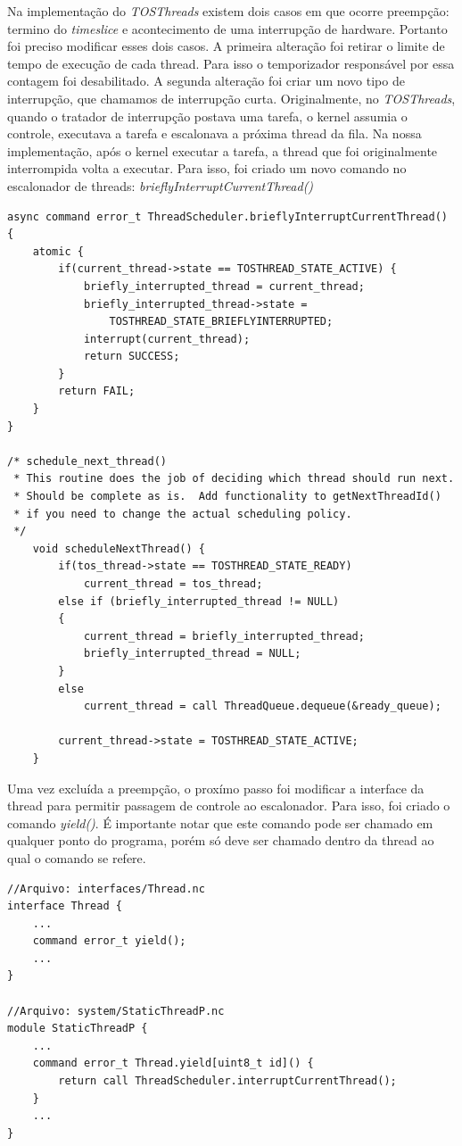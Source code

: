 \documentclass[a4paper, 10pt]{article}
\begin{document}
Na implementação do \textit{TOSThreads} existem dois casos em que ocorre preempção: termino do \textit{timeslice} e
acontecimento de uma interrupção de hardware. Portanto foi preciso modificar esses dois casos.
A primeira alteração foi retirar o limite de tempo de execução de cada thread. Para isso o temporizador responsável por
essa contagem foi desabilitado.
A segunda alteração foi criar um novo tipo de interrupção, que chamamos de interrupção curta. Originalmente, no
\textit{TOSThreads}, quando o tratador de interrupção postava uma tarefa, o kernel assumia o controle, executava a
tarefa e escalonava a próxima thread da fila. Na nossa implementação, após o kernel executar a tarefa, a thread que foi
originalmente interrompida volta a executar. Para isso, foi criado um novo comando no escalonador de threads:
\textit{brieflyInterruptCurrentThread()}
\begin{lstlisting}
async command error_t ThreadScheduler.brieflyInterruptCurrentThread() {
    atomic {
        if(current_thread->state == TOSTHREAD_STATE_ACTIVE) {
            briefly_interrupted_thread = current_thread;
            briefly_interrupted_thread->state =
                TOSTHREAD_STATE_BRIEFLYINTERRUPTED;
            interrupt(current_thread);
            return SUCCESS;
        }
        return FAIL;
    }
}

/* schedule_next_thread()
 * This routine does the job of deciding which thread should run next.
 * Should be complete as is.  Add functionality to getNextThreadId() 
 * if you need to change the actual scheduling policy.
 */
    void scheduleNextThread() {
        if(tos_thread->state == TOSTHREAD_STATE_READY)
            current_thread = tos_thread;
        else if (briefly_interrupted_thread != NULL)
        {
            current_thread = briefly_interrupted_thread;
            briefly_interrupted_thread = NULL;
        }
        else
            current_thread = call ThreadQueue.dequeue(&ready_queue);

        current_thread->state = TOSTHREAD_STATE_ACTIVE;
    }

\end{lstlisting}

Uma vez excluída a preempção, o proxímo passo foi modificar a interface da thread para permitir passagem de controle ao
escalonador. Para isso, foi criado o comando \textit{yield()}. É importante notar que este comando pode ser chamado em 
qualquer ponto do programa, porém só deve ser chamado dentro da thread ao qual o comando se refere.
\begin{lstlisting}
//Arquivo: interfaces/Thread.nc
interface Thread {
    ...
    command error_t yield();
    ...
}

//Arquivo: system/StaticThreadP.nc
module StaticThreadP {
    ...
    command error_t Thread.yield[uint8_t id]() { 
        return call ThreadScheduler.interruptCurrentThread(); 
    } 
    ...
}
\end{lstlisting}
\end{document}
